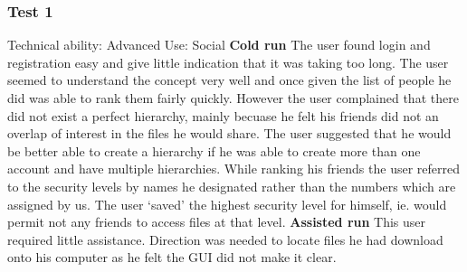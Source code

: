 \documentclass[12pt, titlepage]{article}
\begin{document}
\subsubsection{Test 1}
Technical ability: Advanced
\newline Use: Social
\newline
\newline \textbf{Cold run}
\newline The user found login and registration easy and give little indication that it was taking too long. The user seemed to understand the concept very well and once given the list of people he did was able to rank them fairly quickly. However the user complained that there did not exist a perfect hierarchy, mainly becuase he felt his friends did not an overlap of interest in the files he would share. The user suggested that he would be better able to create a hierarchy if he was able to create more than one account and have multiple hierarchies. While ranking his friends the user referred to the security levels by names he designated rather than the numbers which are assigned by us. The user `saved' the highest security level for himself, ie. would permit not any friends to access files at that level.
\newline
\newline \textbf{Assisted run}
This user required little assistance. Direction was needed to locate files he had download onto his computer as he felt the GUI did not make it clear.
\end{document}
